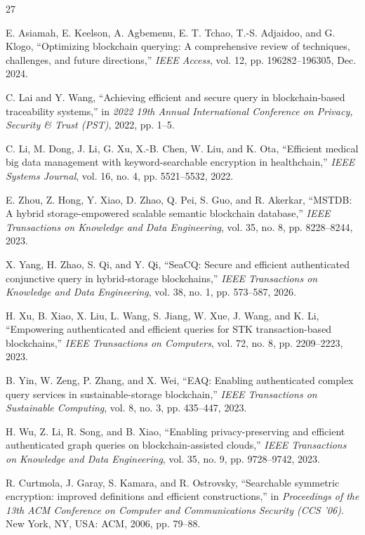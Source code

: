 \begin{thebibliography}{27}

 E. Asiamah, E. Keelson, A. Agbemenu, E. T. Tchao, T.-S. Adjaidoo, and G. Klogo, ``Optimizing blockchain querying: A comprehensive review of techniques, challenges, and future directions,'' \emph{IEEE Access}, vol. 12, pp. 196282--196305, Dec. 2024.

 C. Lai and Y. Wang, ``Achieving efficient and secure query in blockchain-based traceability systems,'' in \emph{2022 19th Annual International Conference on Privacy, Security \& Trust (PST)}, 2022, pp. 1--5.

 C. Li, M. Dong, J. Li, G. Xu, X.-B. Chen, W. Liu, and K. Ota, ``Efficient medical big data management with keyword-searchable encryption in healthchain,'' \emph{IEEE Systems Journal}, vol. 16, no. 4, pp. 5521--5532, 2022.

 E. Zhou, Z. Hong, Y. Xiao, D. Zhao, Q. Pei, S. Guo, and R. Akerkar, ``MSTDB: A hybrid storage-empowered scalable semantic blockchain database,'' \emph{IEEE Transactions on Knowledge and Data Engineering}, vol. 35, no. 8, pp. 8228--8244, 2023.

 X. Yang, H. Zhao, S. Qi, and Y. Qi, ``SeaCQ: Secure and efficient authenticated conjunctive query in hybrid-storage blockchains,'' \emph{IEEE Transactions on Knowledge and Data Engineering}, vol. 38, no. 1, pp. 573--587, 2026.

 H. Xu, B. Xiao, X. Liu, L. Wang, S. Jiang, W. Xue, J. Wang, and K. Li, ``Empowering authenticated and efficient queries for STK transaction-based blockchains,'' \emph{IEEE Transactions on Computers}, vol. 72, no. 8, pp. 2209--2223, 2023.

 B. Yin, W. Zeng, P. Zhang, and X. Wei, ``EAQ: Enabling authenticated complex query services in sustainable-storage blockchain,'' \emph{IEEE Transactions on Sustainable Computing}, vol. 8, no. 3, pp. 435--447, 2023.

 H. Wu, Z. Li, R. Song, and B. Xiao, ``Enabling privacy-preserving and efficient authenticated graph queries on blockchain-assisted clouds,'' \emph{IEEE Transactions on Knowledge and Data Engineering}, vol. 35, no. 9, pp. 9728--9742, 2023.

 R. Curtmola, J. Garay, S. Kamara, and R. Ostrovsky, ``Searchable symmetric encryption: improved definitions and efficient constructions,'' in \emph{Proceedings of the 13th ACM Conference on Computer and Communications Security (CCS '06)}. New York, NY, USA: ACM, 2006, pp. 79--88.


\end{thebibliography}
